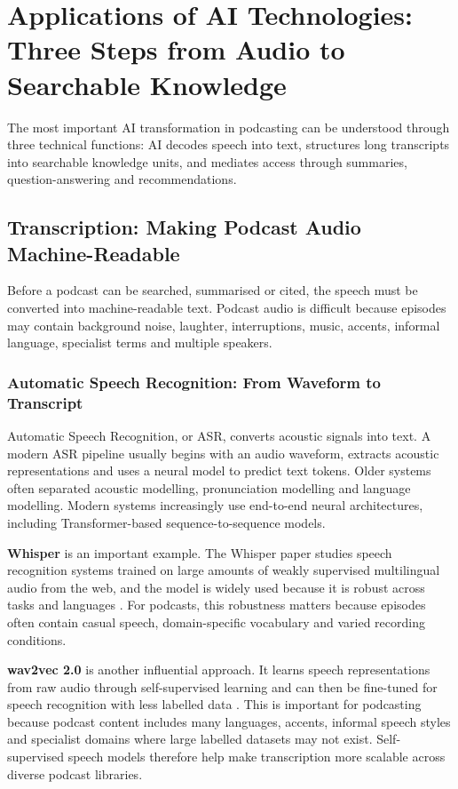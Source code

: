 \documentclass[11pt,a4paper]{article}
\begin{document}
\section{Applications of AI Technologies: Three Steps from Audio to Searchable Knowledge}

The most important AI transformation in podcasting can be understood through three technical functions: AI decodes speech into text, structures long transcripts into searchable knowledge units, and mediates access through summaries, question-answering and recommendations.

\subsection{Transcription: Making Podcast Audio Machine-Readable}

Before a podcast can be searched, summarised or cited, the speech must be converted into machine-readable text. Podcast audio is difficult because episodes may contain background noise, laughter, interruptions, music, accents, informal language, specialist terms and multiple speakers.

\subsubsection{Automatic Speech Recognition: From Waveform to Transcript}

Automatic Speech Recognition, or ASR, converts acoustic signals into text. A modern ASR pipeline usually begins with an audio waveform, extracts acoustic representations and uses a neural model to predict text tokens. Older systems often separated acoustic modelling, pronunciation modelling and language modelling. Modern systems increasingly use end-to-end neural architectures, including Transformer-based sequence-to-sequence models.

\textbf{Whisper} is an important example. The Whisper paper studies speech recognition systems trained on large amounts of weakly supervised multilingual audio from the web, and the model is widely used because it is robust across tasks and languages \cite{Radford2023Whisper}. For podcasts, this robustness matters because episodes often contain casual speech, domain-specific vocabulary and varied recording conditions.


\textbf{wav2vec 2.0} is another influential approach. It learns speech representations from raw audio through self-supervised learning and can then be fine-tuned for speech recognition with less labelled data \cite{Baevski2020wav2vec}. This is important for podcasting because podcast content includes many languages, accents, informal speech styles and specialist domains where large labelled datasets may not exist. Self-supervised speech models therefore help make transcription more scalable across diverse podcast libraries.
\end{document}
